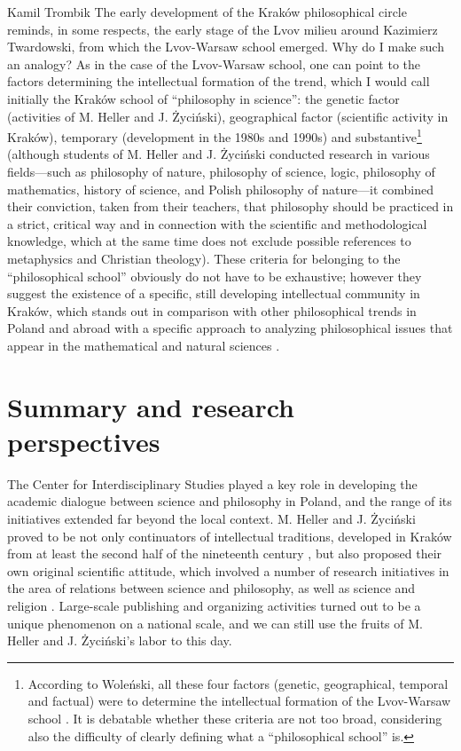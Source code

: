 \begin{artengenv}{Kamil Trombik}
The early development of the Kraków philosophical circle reminds, in some respects, the early stage of the Lvov milieu
around Kazimierz Twardowski, from which the Lvov-Warsaw school emerged. Why do I make such an analogy? As in the case
of the Lvov{}-Warsaw school, one can point to the factors determining the intellectual formation of the trend, which I
would call initially the Kraków school of ``philosophy in science'': the genetic factor (activities of M. Heller and J.
Życiński), geographical factor (scientific activity in Kraków), temporary (development in the 1980s and 1990s) and
substantive\footnote{According to Woleński, all these four factors (genetic, geographical, temporal and factual) were
to determine the intellectual formation of the Lvov-Warsaw school
\parencite{wolenski_filozoficzna_1985}.
It is
debatable whether these criteria are not too broad, considering also the difficulty of clearly defining what a
``philosophical school'' is.} (although students of M. Heller and J. Życiński conducted research in various fields---such
as philosophy of nature, philosophy of science, logic, philosophy of mathematics, history of science, and Polish
philosophy of nature---it combined their conviction, taken from their teachers, that philosophy should be practiced in a
strict, critical way and in connection with the scientific and methodological knowledge, which at the same time does
not exclude possible references to metaphysics and Christian theology). These criteria for belonging to the
``philosophical school'' obviously do not have to be exhaustive; however they suggest the existence of a specific, still
developing intellectual community in Kraków, which stands out in comparison with other philosophical trends in Poland
and abroad with a specific approach to analyzing philosophical issues that appear in the mathematical and natural
sciences
\parencite{heller_jak_1986,heller_how_2019}.

\section{Summary and research perspectives}

The Center for Interdisciplinary Studies played a key role in developing the academic dialogue between science and
philosophy in Poland, and the range of its initiatives extended far beyond the local context. M. Heller and J. Życiński
proved to be not only continuators of intellectual traditions, developed in Kraków from at least the second half of the
nineteenth century
\parencite{polak_19th_2013},
but also proposed their own original scientific attitude,
which involved a number of research initiatives in the area of relations between science and philosophy, as well as
science and religion
\parencite{polak_philosophy_2019}.
Large-scale publishing and organizing activities turned
out to be a unique phenomenon on a national scale, and we can still use the fruits of M. Heller and J. Życiński's labor
to this day.


\end{artengenv}
